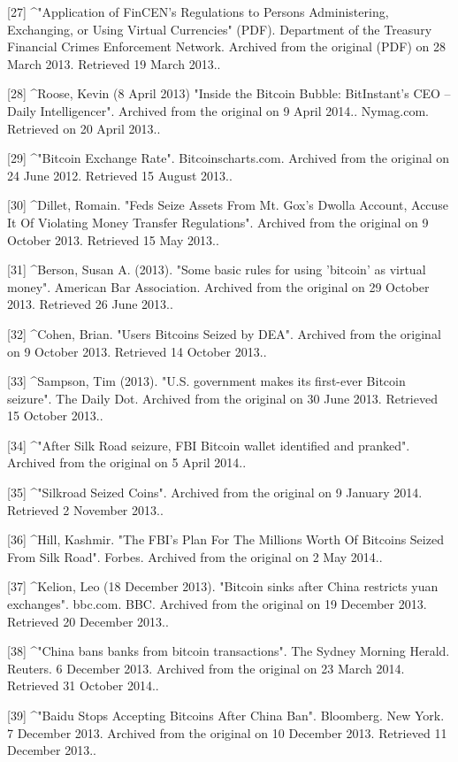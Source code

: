 [27]
^"Application of FinCEN's Regulations to Persons Administering, Exchanging, or Using Virtual Currencies" (PDF). Department of the Treasury Financial Crimes Enforcement Network. Archived from the original (PDF) on 28 March 2013. Retrieved 19 March 2013..

[28]
^Roose, Kevin (8 April 2013) "Inside the Bitcoin Bubble: BitInstant's CEO – Daily Intelligencer". Archived from the original on 9 April 2014.. Nymag.com. Retrieved on 20 April 2013..

[29]
^"Bitcoin Exchange Rate". Bitcoinscharts.com. Archived from the original on 24 June 2012. Retrieved 15 August 2013..

[30]
^Dillet, Romain. "Feds Seize Assets From Mt. Gox's Dwolla Account, Accuse It Of Violating Money Transfer Regulations". Archived from the original on 9 October 2013. Retrieved 15 May 2013..

[31]
^Berson, Susan A. (2013). "Some basic rules for using 'bitcoin' as virtual money". American Bar Association. Archived from the original on 29 October 2013. Retrieved 26 June 2013..

[32]
^Cohen, Brian. "Users Bitcoins Seized by DEA". Archived from the original on 9 October 2013. Retrieved 14 October 2013..

[33]
^Sampson, Tim (2013). "U.S. government makes its first-ever Bitcoin seizure". The Daily Dot. Archived from the original on 30 June 2013. Retrieved 15 October 2013..

[34]
^"After Silk Road seizure, FBI Bitcoin wallet identified and pranked". Archived from the original on 5 April 2014..

[35]
^"Silkroad Seized Coins". Archived from the original on 9 January 2014. Retrieved 2 November 2013..

[36]
^Hill, Kashmir. "The FBI's Plan For The Millions Worth Of Bitcoins Seized From Silk Road". Forbes. Archived from the original on 2 May 2014..

[37]
^Kelion, Leo (18 December 2013). "Bitcoin sinks after China restricts yuan exchanges". bbc.com. BBC. Archived from the original on 19 December 2013. Retrieved 20 December 2013..

[38]
^"China bans banks from bitcoin transactions". The Sydney Morning Herald. Reuters. 6 December 2013. Archived from the original on 23 March 2014. Retrieved 31 October 2014..

[39]
^"Baidu Stops Accepting Bitcoins After China Ban". Bloomberg. New York. 7 December 2013. Archived from the original on 10 December 2013. Retrieved 11 December 2013..

